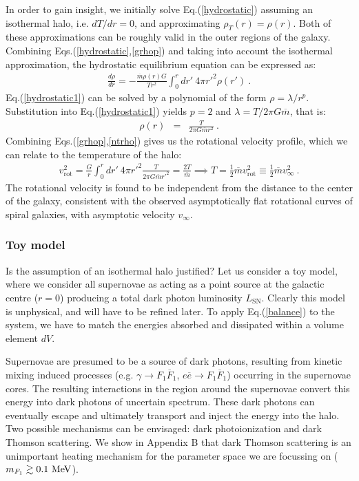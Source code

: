 \documentclass[12pt]{article}
\begin{document}
{{In order to gain insight, we initially solve Eq.(\ref{hydrostatic})
assuming an isothermal halo, i.e. $dT/dr = 0$, and approximating $\rho
_T (r) = \rho (r)$. Both of these approximations can be roughly valid in
the outer regions of the galaxy. Combining
Eqs.(\ref{hydrostatic},\ref{grhop}) and taking into account the
isothermal approximation, the hydrostatic equilibrium equation can be
expressed as:
%
\begin{eqnarray}
\frac{d\rho}{dr} = -\frac{\overline{m}\rho (r) G}{T r ^2}\int _0 ^r dr'
\ 4\pi {r'} ^2 \rho (r') \ .
\label{hydrostatic1}
\end{eqnarray}
%
Eq.(\ref{hydrostatic1}) can be solved by a polynomial of the form $\rho
= \lambda/r ^p$. Substitution into Eq.(\ref{hydrostatic1}) yields $p =
2$ and $\lambda = T/2\pi G\overline{m}$, that is:
%
\begin{eqnarray}
\rho (r) &=& \frac{T}{2\pi G\overline{m}r ^2} \ .
\label{ntrho}
\end{eqnarray}
%
Combining Eqs.(\ref{grhop},\ref{ntrho}) gives us the rotational velocity
profile, which we can relate to the temperature of the halo:
%
\begin{eqnarray}
v _{\text{rot}} ^2 = \frac{G}{r}\int _0 ^r dr' \ 4\pi {r'}
^2\frac{T}{2\pi G\overline{m}{r'} ^2} = \frac{2T}{\overline{m}} \implies
T = \frac{1}{2}\overline{m}v _{\text{rot}} ^2 \equiv
\frac{1}{2}\overline{m}v _{\infty} ^2 \ .
\label{vrot}
\end{eqnarray}
%
The rotational velocity is found to be independent from the distance to
the center of the galaxy, consistent with the observed asymptotically
flat rotational curves of spiral galaxies, with asymptotic velocity $v
_{\infty}$.

\subsubsection{Toy model}

Is the assumption of an isothermal halo justified? Let us consider a toy
model, where we consider all supernovae as acting as a point source at
the galactic centre ($r = 0$) producing a total dark photon luminosity
$L _{\text{SN}}$. Clearly this model is unphysical, and will have to be
refined later. To apply Eq.(\ref{balance}) to the system, we have to
match the energies absorbed and dissipated within a volume element $dV$.

Supernovae are presumed to be a source of dark photons, resulting from
kinetic mixing induced processes (e.g. $\gamma \rightarrow
F_1\overline{F}_1$, $e\overline{e} \rightarrow F_1\overline{F}_1$)
occurring in the supernovae cores. The resulting interactions in the
region around the supernovae convert this energy into dark photons of
uncertain spectrum. These dark photons can eventually escape and
ultimately transport and inject the energy into the halo. Two possible
mechanisms can be 
envisaged: dark photoionization and dark Thomson scattering. We show in
Appendix B that dark Thomson scattering is an unimportant heating
mechanism for the
parameter space we are focussing on ($m _{F_1} \gtrsim 0.1 \ \rm MeV$).

}}
\end{document}
